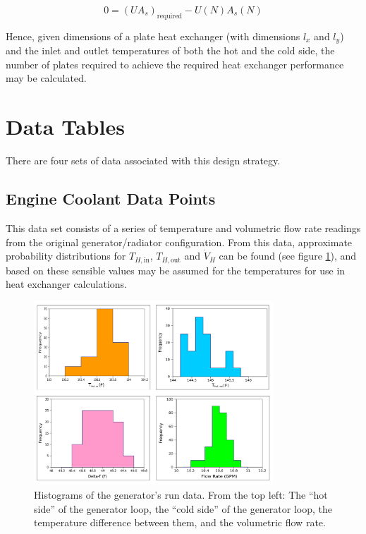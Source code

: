 \documentclass[12pt,letterpaper]{article}
\begin{document}
\begin{equation}
\label{eq:zeros}
0 = (UA_s)_{\textrm{required}} - U(N) A_s(N)
\end{equation}

Hence, given dimensions of a plate heat exchanger (with dimensions \(l_x\) and \(l_y\)) and the inlet and outlet temperatures of both the hot and the cold side, the number of plates required to achieve the required heat exchanger performance may be calculated.

\section{Data Tables}

There are four sets of data associated with this design strategy.

\subsection{Engine Coolant Data Points}

This data set consists of a series of temperature and volumetric flow rate readings from the original generator/radiator configuration. From this data, approximate probability distributions for \(T_{H, \textrm{in}}\), \(T_{H, \textrm{out}}\) and \(\dot{V}_H\) can be found (see figure \ref{fig:hists}), and based on these sensible values may be assumed for the temperatures for use in heat exchanger calculations.

\begin{figure}[t]
\center
\label{fig:hists}
\includegraphics[width=0.8\textwidth]{histograms.png}
\caption{Histograms of the generator's run data. From the top left: The ``hot side'' of the generator loop, the ``cold side'' of the generator loop, the temperature difference between them, and the volumetric flow rate.}
\end{figure}
\end{document}
